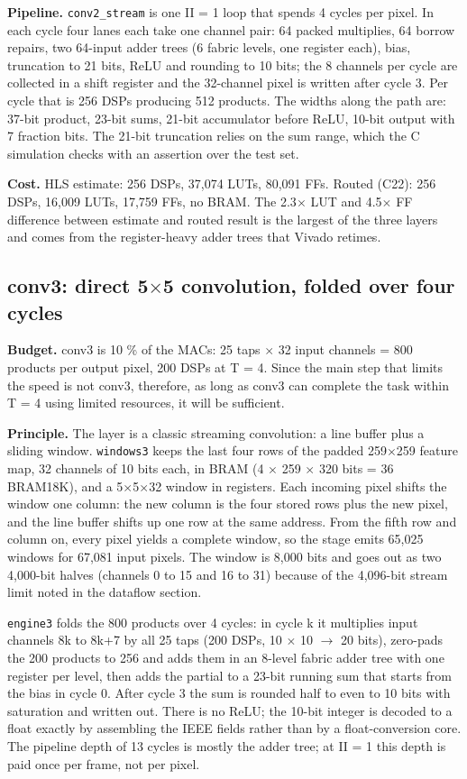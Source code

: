 \textbf{Pipeline.} \texttt{conv2\_stream} is one II = 1 loop that spends 4 cycles per pixel. In each cycle four lanes each take one channel pair: 64 packed multiplies, 64 borrow repairs, two 64-input adder trees (6 fabric levels, one register each), bias, truncation to 21 bits, ReLU and rounding to 10 bits; the 8 channels per cycle are collected in a shift register and the 32-channel pixel is written after cycle 3. Per cycle that is 256 DSPs producing 512 products. The widths along the path are: 37-bit product, 23-bit sums, 21-bit accumulator before ReLU, 10-bit output with 7 fraction bits. The 21-bit truncation relies on the sum range, which the C simulation checks with an assertion over the test set.

\textbf{Cost.} HLS estimate: 256 DSPs, 37,074 LUTs, 80,091 FFs. Routed (C22): 256 DSPs, 16,009 LUTs, 17,759 FFs, no BRAM. The 2.3$\times$ LUT and 4.5$\times$ FF difference between estimate and routed result is the largest of the three layers and comes from the register-heavy adder trees that Vivado retimes.

\subsection{conv3: direct 5$\times$5 convolution, folded over four cycles}\label{sec:4.5}

\textbf{Budget.} conv3 is 10 \% of the MACs: 25 taps $\times$ 32 input channels = 800 products per output pixel, 200 DSPs at T = 4. Since the main step that limits the speed is not conv3, therefore, as long as conv3 can complete the task within T = 4 using limited resources, it will be sufficient.

\textbf{Principle.} The layer is a classic streaming convolution: a line buffer plus a sliding window. \texttt{windows3} keeps the last four rows of the padded 259$\times$259 feature map, 32 channels of 10 bits each, in BRAM (4 $\times$ 259 $\times$ 320 bits = 36 BRAM18K), and a 5$\times$5$\times$32 window in registers. Each incoming pixel shifts the window one column: the new column is the four stored rows plus the new pixel, and the line buffer shifts up one row at the same address. From the fifth row and column on, every pixel yields a complete window, so the stage emits 65,025 windows for 67,081 input pixels. The window is 8,000 bits and goes out as two 4,000-bit halves (channels 0 to 15 and 16 to 31) because of the 4,096-bit stream limit noted in the dataflow section.

\texttt{engine3} folds the 800 products over 4 cycles: in cycle k it multiplies input channels 8k to 8k+7 by all 25 taps (200 DSPs, 10 $\times$ 10 $\rightarrow$ 20 bits), zero-pads the 200 products to 256 and adds them in an 8-level fabric adder tree with one register per level, then adds the partial to a 23-bit running sum that starts from the bias in cycle 0. After cycle 3 the sum is rounded half to even to 10 bits with saturation and written out. There is no ReLU; the 10-bit integer is decoded to a float exactly by assembling the IEEE fields rather than by a float-conversion core. The pipeline depth of 13 cycles is mostly the adder tree; at II = 1 this depth is paid once per frame, not per pixel.

